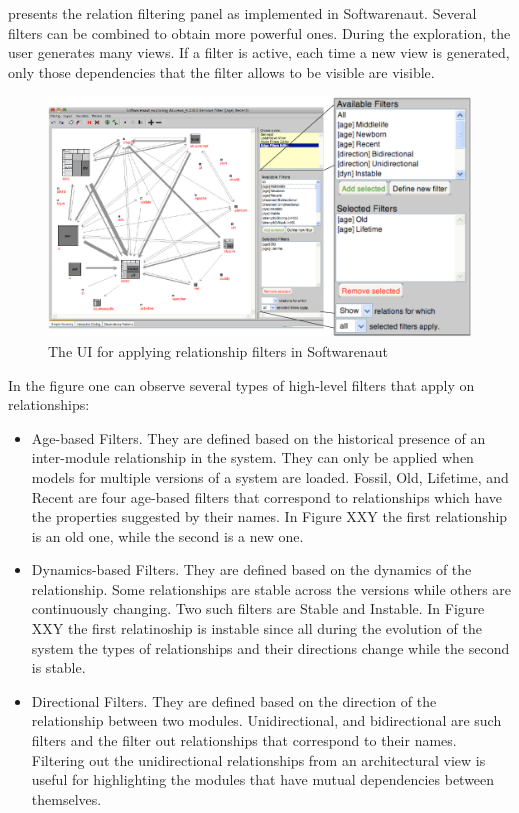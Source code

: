 \documentclass[preprint,12pt]{elsarticle}
\begin{document}
 presents the relation filtering panel as implemented in Softwarenaut. Several filters can be combined to obtain more powerful ones. During the exploration, the user generates many views. If a filter is active, each time a new view is generated, only those dependencies that the filter allows to be visible are visible.


\begin{figure}[h]
\begin{center}
\includegraphics[width=0.8\linewidth]{images/SnautFilteringPanel}
\caption{The UI for applying relationship filters in Softwarenaut}
\end{center}
\end{figure}


In the figure one can observe several types of high-level filters that apply on relationships: 

\begin{itemize}
\item Age-based Filters. They are defined based on the historical presence of an inter-module relationship in the system. They can only be applied when models for multiple versions of a system are loaded. Fossil, Old, Lifetime, and Recent are four age-based filters that correspond to relationships which have the properties suggested by their names. In Figure XXY the first relationship is an old one, while the second is a new one. 

\item Dynamics-based Filters. They are defined based on the dynamics of the relationship. Some relationships are stable across the versions while others are continuously changing. Two such filters are Stable and Instable. In Figure XXY the first relatinoship is instable since all during the evolution of the system the types of relationships and their directions change while the second is stable.

\item Directional Filters. They are defined based on the direction of the relationship between two modules. Unidirectional, and bidirectional are such filters and the filter out relationships that correspond to their names. Filtering out the unidirectional relationships from an architectural view is useful for highlighting the modules that have mutual dependencies between themselves. 
\end{itemize}
\end{document}
